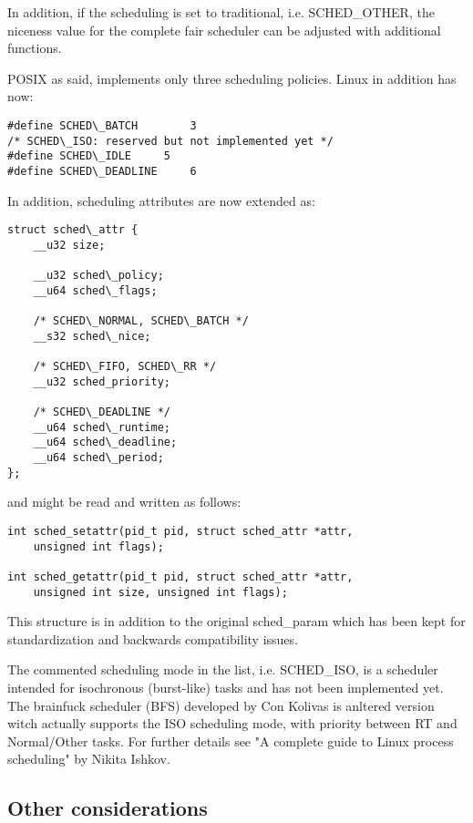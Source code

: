 \documentclass[]{scrartcl}
\begin{document}
In addition, if the scheduling is set to traditional, i.e. SCHED\_OTHER, the niceness value for the complete fair scheduler can be adjusted with additional functions. 

POSIX as said, implements only three scheduling policies.
Linux in addition has now:

\begin{verbatim}
#define SCHED\_BATCH		3
/* SCHED\_ISO: reserved but not implemented yet */
#define SCHED\_IDLE		5
#define SCHED\_DEADLINE		6
\end{verbatim}


In addition, scheduling attributes are now extended as:

\begin{verbatim}
struct sched\_attr {
	__u32 size;
	
	__u32 sched\_policy;
	__u64 sched\_flags;
	
	/* SCHED\_NORMAL, SCHED\_BATCH */
	__s32 sched\_nice;
	
	/* SCHED\_FIFO, SCHED\_RR */
	__u32 sched_priority;
	
	/* SCHED\_DEADLINE */
	__u64 sched\_runtime;
	__u64 sched\_deadline;
	__u64 sched\_period;
};
\end{verbatim}

and might be read and written as follows:


\begin{verbatim}
int sched_setattr(pid_t pid, struct sched_attr *attr,
	unsigned int flags);

int sched_getattr(pid_t pid, struct sched_attr *attr,
	unsigned int size, unsigned int flags);
\end{verbatim}

This structure is in addition to the original sched\_param which has been kept for standardization and backwards compatibility issues.

The commented scheduling mode in the list, i.e. SCHED\_ISO, is a scheduler intended for isochronous (burst-like) tasks and has not been implemented yet. 
The brainfuck scheduler (BFS) developed by Con Kolivas is anltered version witch actually supports the ISO scheduling mode, with priority between RT and Normal/Other tasks.
For further details see "A complete guide to Linux process scheduling"  by Nikita Ishkov.


\subsection{Other considerations}
\end{document}
